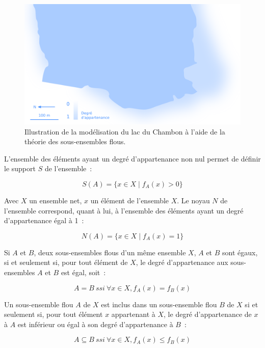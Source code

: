 \begin{figure}
  \centering
  \includegraphics{../figures/fig6.png}
  \caption{Illustration de la modélisation du lac du Chambon à l’aide
    de la théorie des sous-ensembles flous.}
  \label{fig:champ_flou}
\end{figure}

L’ensemble des éléments ayant un degré d’appartenance non nul permet
de définir le support $S$ de l’ensemble :

\begin{equation}
  S(A) = \{x ∈ X \mid f_A(x) > 0\}
\end{equation}

Avec $X$ un ensemble net, $x$ un élément de l’ensemble $X$. Le noyau
$N$ de l’ensemble correspond, quant à lui, à l’ensemble des éléments
ayant un degré d’appartenance égal à 1 :

\begin{equation}
  N(A) = \{x ∈ X \mid f_A(x) = 1\}
\end{equation}

Si $A$ et $B$, deux sous-ensembles flous d’un même ensemble $X$, $A$
et $B$ sont égaux, si et seulement si, pour tout élément de $X$, le
degré d’appartenance aux sous-ensembles $A$ et $B$ est égal, soit :

\begin{equation}
  A = B\ ssi\ ∀x ∈ X, f_A(x) = f_B(x)
\end{equation}

Un sous-ensemble flou $A$ de $X$ est inclus dans un sous-ensemble flou
$B$ de $X$ si et seulement si, pour tout élément $x$ appartenant à
$X$, le degré d’appartenance de $x$ à $A$ est inférieur ou égal à son
degré d’appartenance à $B$ :

\begin{equation}
  A ⊆ B\ ssi\ ∀x ∈ X, f_A(x) ≤ f_B(x)
\end{equation}

